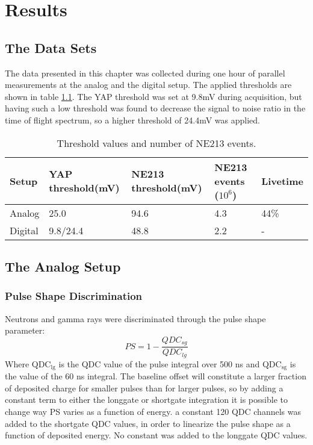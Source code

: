 \documentclass[main.tex]{subfiles}
\begin{document}
\chapter{Results}

\section{The Data Sets}
The data presented in this chapter was collected during one hour of parallel measurements at the analog and the digital setup. The applied thresholds are shown in table \ref{tab:settings}. The YAP threshold was set at 9.8\si{\milli\volt} during acquisition, but having such a low threshold was found to decrease the signal to noise ratio in the time of flight spectrum, so a higher threshold of 24.4\si{\milli\volt} was applied.
\begin{table}[bh]
\begin{tabular}{|l|l|l|l|l|}
\hline
Setup   & YAP threshold(mV) & NE213 threshold(mV) & NE213 events ($\text{10}^\text{6}$) & Livetime \\ \hline
Analog  & 25.0              & 94.6                & 4.3      & 44\%             \\ \hline
Digital & 9.8/24.4	        & 48.8                & 2.2      & -             \\ \hline
\end{tabular}
\caption{Threshold values and number of NE213 events.}
\label{tab:settings}
\end{table}
\section{The Analog Setup}
\subsection{Pulse Shape Discrimination}
Neutrons and gamma rays were discriminated through the pulse shape parameter: 
\begin{equation}
PS=1-\frac{QDC_{sg}}{QDC_{lg}}
\end{equation}
Where QDC$_\text{lg}$ is the QDC value of the pulse integral over 500 ns and QDC$_\text{sg}$ is the value of the 60 ns integral. The baseline offset will constitute a larger fraction of deposited charge for smaller pulses than for larger pulses, so by adding a constant term to either the longgate or shortgate integration it is possible to change way PS varies as a function of energy. a constant 120 QDC channels was added to the shortgate QDC values, in order to linearize the pulse shape as a function of deposited energy. No constant was added to the longgate QDC values. 
\end{document}
